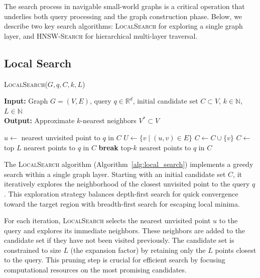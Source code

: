 \documentclass{article}
\begin{document}
The search process in navigable small-world graphs is a critical operation that underlies both query processing and the graph construction phase. Below, we describe two key search algorithms: \textsc{LocalSearch} for exploring a single graph layer, and \textsc{HNSW-Search} for hierarchical multi-layer traversal.

\subsection{Local Search}

\begin{algorithm}
\caption{\textsc{LocalSearch}($G, q, C, k, L$)}\label{alg:local_search}
\textbf{Input:} Graph $G = (V, E)$, query $q \in \mathbb{R}^d$, initial candidate set $C \subset V$, $k \in \mathbb{N}$, $L \in \mathbb{N}$ \\
\textbf{Output:} Approximate $k$-nearest neighbors $V^* \subset V$
\begin{algorithmic}[1]
    \State $u \gets$ nearest unvisited point to $q$ in $C$
    \State $U \gets \{v \mid (u, v) \in E\}$
            \State $C \gets C \cup \{v\}$
        \EndIf
    \EndFor
        \State $C \gets$ top $L$ nearest points to $q$ in $C$
    \EndIf
        \State \textbf{break}
    \EndIf
\EndWhile
\State \Return top-$k$ nearest points to $q$ in $C$
\end{algorithmic}
\end{algorithm}

The \textsc{LocalSearch} algorithm (Algorithm~\ref{alg:local_search}) implements a greedy search within a single graph layer. Starting with an initial candidate set $C$, it iteratively explores the neighborhood of the closest unvisited point to the query $q$. This exploration strategy balances depth-first search for quick convergence toward the target region with breadth-first search for escaping local minima.

For each iteration, \textsc{LocalSearch} selects the nearest unvisited point $u$ to the query and explores its immediate neighbors. These neighbors are added to the candidate set if they have not been visited previously. The candidate set is constrained to size $L$ (the expansion factor) by retaining only the $L$ points closest to the query. This pruning step is crucial for efficient search by focusing computational resources on the most promising candidates.
\end{document}
